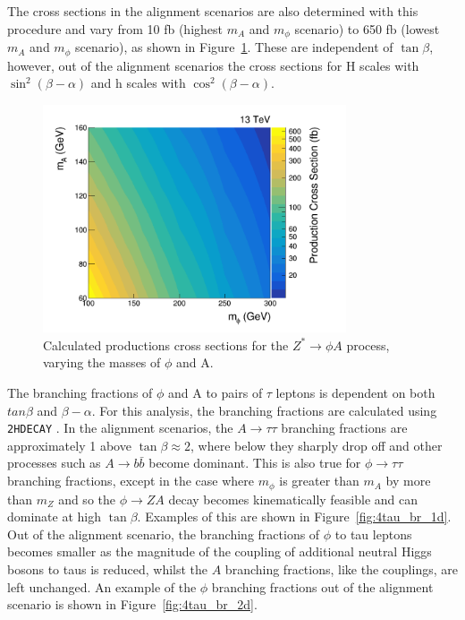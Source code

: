 The cross sections in the alignment scenarios are also determined with this procedure and vary from 10 fb (highest $m_{A}$ and $m_{\phi}$ scenario) to 650 fb (lowest $m_{A}$ and $m_{\phi}$ scenario), as shown in Figure~\ref{fig:4tau_xs}.
These are independent of $\tan\beta$, however, out of the alignment scenarios the cross sections for H scales with $\sin^{2}(\beta-\alpha)$ and h scales with $\cos^{2}(\beta-\alpha)$.

\begin{figure}[!hbtp]
\centering
    \includegraphics[width=0.8\textwidth]{Figures/cross_sections.png}
\caption{Calculated productions cross sections for the $Z^{*} \rightarrow \phi A$ process, varying the masses of $\phi$ and A.}
\label{fig:4tau_xs}
\end{figure}

The branching fractions of $\phi$ and A to pairs of $\tau$ leptons is dependent on both $tan\beta$ and $\beta-\alpha$.
For this analysis, the branching fractions are calculated using \texttt{2HDECAY} \cite{Krause:2018wmo}.
In the alignment scenarios, the $A\rightarrow\tau\tau$ branching fractions are approximately 1 above $\tan\beta \approx 2$, where below they sharply drop off and other processes such as $A\rightarrow b\bar{b}$ become dominant.
This is also true for $\phi\rightarrow\tau\tau$ branching fractions, except in the case where $m_\phi$ is greater than $m_A$ by more than $m_Z$ and so the $\phi\rightarrow ZA$ decay becomes kinematically feasible and can dominate at high $\tan\beta$.
Examples of this are shown in Figure~\ref{fig:4tau_br_1d}.
Out of the alignment scenario, the branching fractions of $\phi$ to tau leptons becomes smaller as the magnitude of the coupling of additional neutral Higgs bosons to taus is reduced, whilst the $A$ branching fractions, like the couplings, are left unchanged.
An example of the $\phi$ branching fractions out of the alignment scenario is shown in Figure~\ref{fig:4tau_br_2d}.

